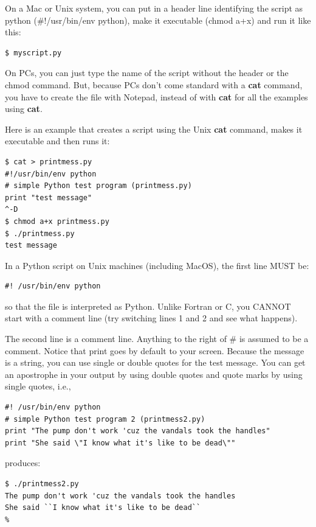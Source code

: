 \documentclass[11pt]{book}
\begin{document}
{{{{On a Mac or Unix system,  you can put in a header line identifying the script as python (\#!/usr/bin/env python), make it executable (chmod a+x) and run it like this:

{ \color{blue} \begin{verbatim}
$ myscript.py
\end{verbatim}}

On PCs, you can just type the name of the script without the header or the chmod command.   But, because PCs don't come standard with a {\bf cat} command, you have to create the file with Notepad, instead of with {\bf cat} for all the examples using {\bf cat}.

Here is an example that creates a script using the Unix {\bf cat} command, makes it executable and then runs it:

{ \color{blue} \begin{verbatim}
$ cat > printmess.py
#!/usr/bin/env python
# simple Python test program (printmess.py)
print "test message"
^-D
$ chmod a+x printmess.py
$ ./printmess.py
test message
\end{verbatim}}

\noindent
In a Python script on Unix machines (including MacOS), the  first line MUST be:

{ \color{blue} \begin{verbatim}
#! /usr/bin/env python
\end{verbatim}}

\noindent
so that the file is interpreted as Python.  Unlike Fortran or C, you CANNOT start with a
comment line (try switching lines 1 and 2 and see what happens).

The second line is a comment line.  Anything to the right of \# is assumed to be a comment.
Notice that print goes by default to your screen.  Because the message is a string, you can use single or double quotes
for the test message.  You can get an apostrophe in your output by using double quotes
and quote marks by using single quotes, i.e.,

{ \color{blue} \begin{verbatim}
#! /usr/bin/env python
# simple Python test program 2 (printmess2.py)
print "The pump don't work 'cuz the vandals took the handles"
print "She said \"I know what it's like to be dead\""
\end{verbatim}}

\noindent
produces:

{ \color{blue} \begin{verbatim}
$ ./printmess2.py
The pump don't work 'cuz the vandals took the handles
She said ``I know what it's like to be dead``
%
\end{verbatim}}

}}}}
\end{document}
